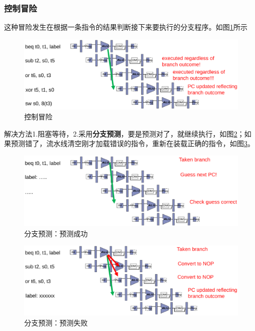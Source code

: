 \subsubsection{控制冒险}
这种冒险发生在根据一条指令的结果判断接下来要执行的分支程序。如图\ref{fig:Control_Hazards}所示

\begin{figure}[htbp]
  \centering %
  \includegraphics[width=0.8 \textwidth]{figs/RISC-V/流水线/控制冒险.eps}
  \caption{控制冒险}
  \label{fig:Control_Hazards} %
\end{figure}

解决方法1.阻塞等待，2.采用\textbf{分支预测}，要是预测对了，就继续执行，如图\ref{fig:Control_Hazards_Success}；如果预测错了，流水线清空刚才加载错误的指令，重新在装载正确的指令，如图\ref{fig:Control_Hazards_Fail}。

\begin{figure}[htbp]
  \centering %
  \includegraphics[width=0.8 \textwidth]{figs/RISC-V/流水线/控制冒险_预测成功.eps}
  \caption{分支预测：预测成功}
  \label{fig:Control_Hazards_Success} %
\end{figure}

\begin{figure}[htbp]
  \centering %
  \includegraphics[width=0.8 \textwidth]{figs/RISC-V/流水线/控制冒险_预测失败.eps}
  \caption{分支预测：预测失败}
  \label{fig:Control_Hazards_Fail} %
\end{figure}







